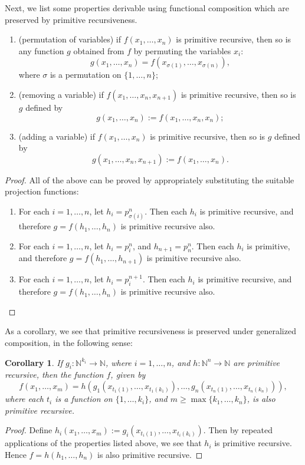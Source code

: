 \documentclass[12pt]{article}
\newtheorem{cor}{Corollary}
\begin{document}
Next, we list some properties derivable using functional composition which are preserved by primitive recursiveness.
\begin{enumerate}
\item (permutation of variables) if $f(x_1,\ldots, x_n)$ is primitive recursive, then so is any function $g$ obtained from $f$ by permuting the variables $x_i$: $$g(x_1,\ldots, x_n)=f(x_{\sigma(1)},\ldots,x_{\sigma(n)}),$$ where $\sigma$ is a permutation on $\lbrace 1,\ldots, n\rbrace$;
\item (removing a variable) if $f(x_1,\ldots, x_n, x_{n+1})$ is primitive recursive, then so is $g$ defined by $$g(x_1,\ldots,x_n):=f(x_1,\ldots,x_n,x_n);$$
\item (adding a variable) if $f(x_1,\ldots,x_n)$ is primitive recursive, then so is $g$ defined by $$g(x_1,\ldots,x_n,x_{n+1}):=f(x_1,\ldots,x_n).$$
\end{enumerate}
\begin{proof}  All of the above can be proved by appropriately substituting the suitable projection functions:
\begin{enumerate}
\item For each $i=1,\ldots,n$, let $h_i = p_{\sigma(i)}^n$.  Then each $h_i$ is primitive recursive, and therefore $g=f(h_1,\ldots,h_n)$ is primitive recursive also.
\item For each $i=1,\ldots, n$, let $h_i=p_i^n$, and $h_{n+1}=p_n^n$.  Then each $h_i$ is primitive, and therefore $g=f(h_1,\ldots,h_{n+1})$ is primitive recursive also.
\item For each $i=1,\ldots,n$, let $h_i=p_i^{n+1}$.  Then each $h_i$ is primitive recursive, and therefore $g=f(h_1,\ldots,h_n)$ is primitive recursive also.
\end{enumerate}
\end{proof}

As a corollary, we see that primitive recursiveness is preserved under generalized composition, in the following sense:
\begin{cor} If $g_i:\mathbb{N}^{k_i}\to \mathbb{N}$, where $i=1,\ldots,n$, and $h:\mathbb{N}^n\to \mathbb{N}$ are primitive recursive, then the function $f$, given by $$f(x_1,\ldots,x_m)=h(g_1(x_{t_1(1)},\ldots,x_{t_1(k_1)}),\ldots,g_n(x_{t_n(1)},\ldots,x_{t_n(k_n)})),$$ where each $t_i$ is a function on $\lbrace 1,\ldots, k_i\rbrace$, and $m\ge \max\lbrace k_1,\ldots, k_n\rbrace$, is also primitive recursive.
\end{cor}
\begin{proof} Define $h_i(x_1,\ldots,x_m):=g_i(x_{t_i(1)},\ldots,x_{t_i(k_i)})$.  Then by repeated applications of the properties listed above, we see that $h_i$ is primitive recursive.  Hence $f=h(h_1,\ldots,h_n)$ is also primitive recursive. \end{proof}
\end{document}
